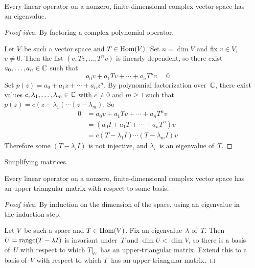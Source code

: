 \begin{thm}
Every linear operator on a nonzero, finite-dimensional complex vector space has an eigenvalue.
\end{thm}
\begin{proof}[Proof idea]
By factoring a complex polynomial operator.

Let \(V\)~be such a vector space and \(T\in\operatorname{Hom}(V)\). Set \(n=\dim V\) and fix \(v\in V\), \(v\ne0\). Then the list \((v,Tv,\ldots,T^nv)\) is linearly dependent, so there exist \(a_0,\ldots,a_n\in\mathbb{C}\) such that
\[a_0v+a_1Tv+\cdots+a_nT^nv=0\]
Set \(p(z)=a_0+a_1z+\cdots+a_nz^n\). By polynomial factorization over~\(\mathbb{C}\), there exist values \(c,\lambda_1,\ldots,\lambda_m\in\mathbb{C}\) with \(c\ne0\) and \(m\ge1\) such that \(p(z)=c(z-\lambda_1)\cdots(z-\lambda_m)\). So
\begin{align*}
0&=a_0v+a_1Tv+\cdots+a_nT^nv\\
	&=(a_0I+a_1T+\cdots+a_nT^n)v\\
	&=c(T-\lambda_1I)\cdots(T-\lambda_mI)v
\end{align*}
Therefore some \((T-\lambda_iI)\) is not injective, and \(\lambda_i\)~is an eigenvalue of~\(T\).
\end{proof}
\begin{app}
Simplifying matrices.
\end{app}

\begin{cor}
Every linear operator on a nonzero, finite-dimensional complex vector space has an upper-triangular matrix with respect to some basis.
\end{cor}
\begin{proof}[Proof idea]
By induction on the dimension of the space, using an eigenvalue in the induction step.

Let \(V\)~be such a space and \(T\in\operatorname{Hom}(V)\). Fix an eigenvalue~\(\lambda\) of~\(T\). Then \(U=\operatorname{range}(T-\lambda I)\) is invariant under~\(T\) and \(\dim U<\dim V\), so there is a basis of~\(U\) with respect to which \(T|_U\)~has an upper-triangular matrix. Extend this to a basis of~\(V\) with respect to which \(T\)~has an upper-triangular matrix.
\end{proof}

